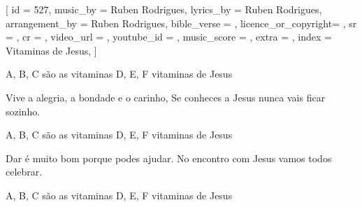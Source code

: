 [
    id                  = {527},
    music_by            = {Ruben Rodrigues}, %
    lyrics_by           = {Ruben Rodrigues}, %
    arrangement_by      = {Ruben Rodrigues}, %
    bible_verse         = {},
    licence_or_copyright= {},
    sr                  = {},
    cr                  = {},
    video_url           = {}, %
    youtube_id          = {}, %
    music_score         = {}, %
    extra               = {},
    index               = {Vitaminas de Jesus},
]

\beginchorus
A, B, C são as vitaminas 
D, E, F vitaminas de Jesus 
\endchorus

\beginverse
Vive a alegria, a bondade e o carinho, 
Se conheces a Jesus nunca vais ficar sozinho.
\endverse

\beginchorus
A, B, C são as vitaminas 
D, E, F vitaminas de Jesus 
\endchorus

\beginverse
Dar é muito bom porque podes ajudar. 
No encontro com Jesus vamos todos celebrar.
\endverse

\beginchorus
A, B, C são as vitaminas 
D, E, F vitaminas de Jesus
\endverse

\endsong
